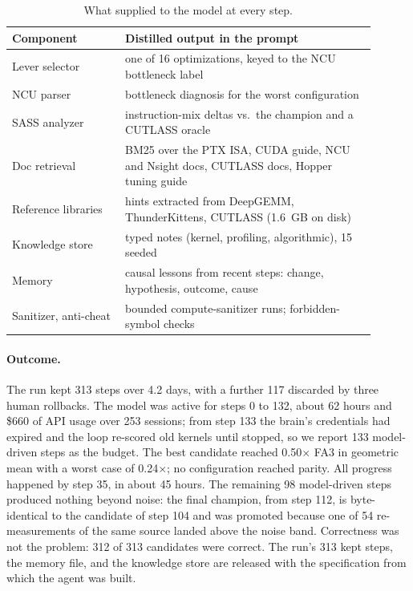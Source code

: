 \begin{table}[tbp]
\centering\small
\caption{What \ksBaseline supplied to the model at every step.}
\label{kernelseek:tab:baseline}
\setlength{\tabcolsep}{4pt}
\begin{tabular}{@{}p{0.28\linewidth}p{0.62\linewidth}@{}}
\toprule
Component & Distilled output in the prompt \\
\midrule
Lever selector & one of 16 optimizations, keyed to the NCU bottleneck label \\
NCU parser & bottleneck diagnosis for the worst configuration \\
SASS analyzer & instruction-mix deltas vs.\ the champion and a CUTLASS oracle \\
Doc retrieval & BM25 over the PTX ISA, CUDA guide, NCU and Nsight docs, CUTLASS docs, Hopper tuning guide \\
Reference libraries & hints extracted from DeepGEMM, ThunderKittens, CUTLASS (1.6~GB on disk) \\
Knowledge store & typed notes (kernel, profiling, algorithmic), 15 seeded \\
Memory & causal lessons from recent steps: change, hypothesis, outcome, cause \\
Sanitizer, anti-cheat & bounded compute-sanitizer runs; forbidden-symbol checks \\
\bottomrule
\end{tabular}
\end{table}

\paragraph{Outcome.} The run kept 313 steps over 4.2 days, with a further 117 discarded by three
human rollbacks. The model was active for steps 0 to 132, about 62 hours and \$660 of API usage over
253 sessions; from step 133 the brain's credentials had expired and the loop re-scored old kernels
until stopped, so we report 133 model-driven steps as the budget. The best candidate reached
0.50$\times$ FA3 in geometric mean with a worst case of 0.24$\times$; no configuration reached
parity. All progress happened by step 35, in about 45 hours. The remaining 98 model-driven steps
produced nothing beyond noise: the final champion, from step 112, is byte-identical to the candidate
of step 104 and was promoted because one of 54 re-measurements of the same source landed above the
noise band. Correctness was not the problem: 312 of 313 candidates were correct. The run's 313 kept
steps, the memory file, and the knowledge store are released with the specification from which the
agent was built.

